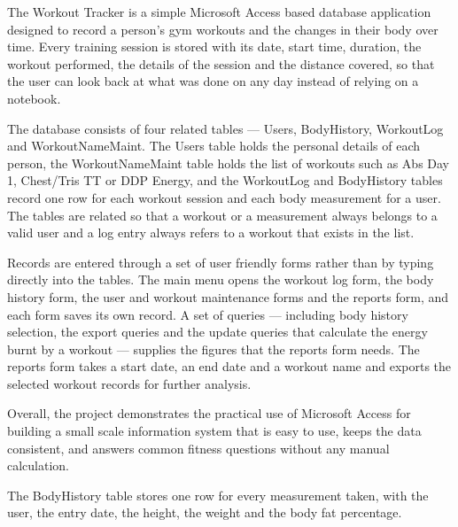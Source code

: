 {\fontsize{12}{15.6}\selectfont
\setlength{\parskip}{8pt}

The Workout Tracker is a simple Microsoft Access based database application
designed to record a person's gym workouts and the changes in their body over
time. Every training session is stored with its date, start time, duration, the
workout performed, the details of the session and the distance covered, so that
the user can look back at what was done on any day instead of relying on a
notebook.

The database consists of four related tables --- Users, BodyHistory,
WorkoutLog and WorkoutNameMaint. The Users table holds the personal details of
each person, the WorkoutNameMaint table holds the list of workouts such as Abs
Day 1, Chest/Tris TT or DDP Energy, and the WorkoutLog and BodyHistory tables
record one row for each workout session and each body measurement for a user.
The tables are related so that a workout or a measurement always belongs to a
valid user and a log entry always refers to a workout that exists in the list.

Records are entered through a set of user friendly forms rather than by typing
directly into the tables. The main menu opens the workout log form, the body
history form, the user and workout maintenance forms and the reports form, and
each form saves its own record. A set of queries --- including body history
selection, the export queries and the update queries that calculate the energy
burnt by a workout --- supplies the figures that the reports form needs. The
reports form takes a start date, an end date and a workout name and exports the
selected workout records for further analysis.

Overall, the project demonstrates the practical use of Microsoft Access for
building a small scale information system that is easy to use, keeps the data
consistent, and answers common fitness questions without any manual
calculation.

\par}

\clearpage
{}


{\small The BodyHistory table stores one row for every measurement taken, with
the user, the entry date, the height, the weight and the body fat percentage.}
\vspace{4pt}



